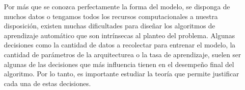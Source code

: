 Por más que se conozca perfectamente la forma del modelo, se disponga de muchos datos o tengamos todos los recursos computacionales a nuestra disposición, existen muchas dificultades para diseñar los algoritmos de aprendizaje automático que son intrínsecas al planteo del problema. Algunas decisiones como la cantidad de datos a recolectar para entrenar el modelo, la cantidad de parámetros de la arquitecturea o la tasa de aprendizaje, suelen ser algunas de las decisiones que más influencia tienen en el desempeño final del algoritmo. Por lo tanto, es importante estudiar la teoría que permite justificar cada una de estas decisiones.